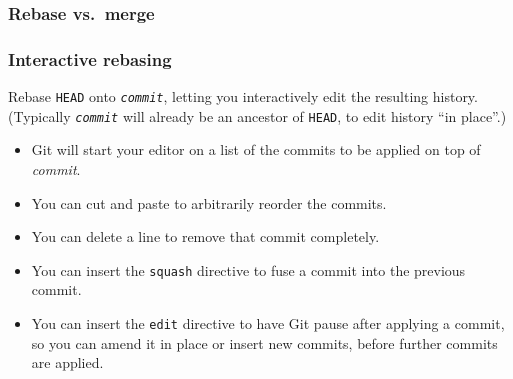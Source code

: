 \documentclass{beamer}
\begin{document}
\begin{frame}
  \frametitle{Rebase vs.\ merge}
  \begin{itemize}
  \end{itemize}
    \begin{center}
  \end{center}
\end{frame}

\begin{frame}
  \frametitle{Interactive rebasing}
  \begin{description}
  \item[\texttt{git rebase -i \textit{commit}}\hfill] Rebase
    \texttt{HEAD} onto \texttt{\textit{commit}}, letting you
    interactively edit the resulting history.  (Typically
    \texttt{\textit{commit}} will already be an ancestor of
    \texttt{HEAD}, to edit history ``in place''.)
  \end{description}

  \begin{itemize}
  \item Git will start your editor on a list of the commits to be
    applied on top of \textit{commit}.
  \item You can cut and paste to arbitrarily reorder the commits.
  \item You can delete a line to remove that commit completely.
  \item You can insert the \texttt{squash} directive to fuse a commit
    into the previous commit.
  \item You can insert the \texttt{edit} directive to have Git pause
    after applying a commit, so you can amend it in place or insert
    new commits, before further commits are applied.
  \end{itemize}
\end{frame}
\end{document}
